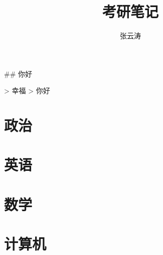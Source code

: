\documentclass{book}
\title{考研笔记}
\author{张云涛}
\begin{document}
\maketitle

\tableofcontents


\begin{markdown}
## 你好

> 幸福 
> 你好 

\end{markdown}

\part{政治}


\part{英语}


\part{数学}
















  





\part{计算机}

















\end{document}

